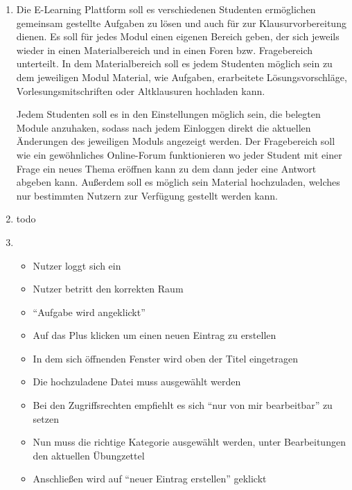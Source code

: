 \documentclass[a4paper,10pt]{scrartcl}
\begin{document}
\kopf
\renewcommand{\figurename}{Figure}


\begin{enumerate}
	\item
	Die E-Learning Plattform soll es verschiedenen Studenten ermöglichen gemeinsam gestellte Aufgaben zu lösen und auch für zur Klausurvorbereitung dienen. Es soll für jedes Modul einen eigenen Bereich geben, der sich jeweils wieder in einen Materialbereich und in einen Foren bzw. Fragebereich unterteilt. In dem Materialbereich soll es jedem Studenten möglich sein zu dem jeweiligen Modul Material, wie Aufgaben, erarbeitete Lösungsvorschläge, Vorlesungsmitschriften oder Altklausuren hochladen kann. 
	
	Jedem Studenten soll es in den Einstellungen möglich sein, die belegten Module anzuhaken, sodass nach jedem Einloggen direkt die aktuellen Änderungen des jeweiligen Moduls angezeigt werden. Der Fragebereich soll wie ein gewöhnliches Online-Forum  funktionieren wo jeder Student mit einer Frage ein neues Thema eröffnen kann zu dem dann jeder eine Antwort abgeben kann. Außerdem soll es möglich sein Material hochzuladen, welches nur bestimmten Nutzern zur Verfügung gestellt werden kann.
	\item todo
	\item
	\begin{itemize}
		\item Nutzer loggt sich ein
		\item Nutzer betritt den korrekten Raum
		\item "`Aufgabe wird angeklickt"'
		\item Auf das Plus klicken um einen neuen Eintrag zu erstellen
		\item In dem sich öffnenden Fenster wird oben der Titel eingetragen
		\item Die hochzuladene Datei muss ausgewählt werden
		\item Bei den Zugriffsrechten empfiehlt es sich "`nur von mir bearbeitbar"' zu setzen
		\item Nun muss die richtige Kategorie ausgewählt werden, unter Bearbeitungen den aktuellen Übungzettel
		\item Anschließen wird auf "`neuer Eintrag erstellen"' geklickt
	\end{itemize}
\end{enumerate}
\end{document}
